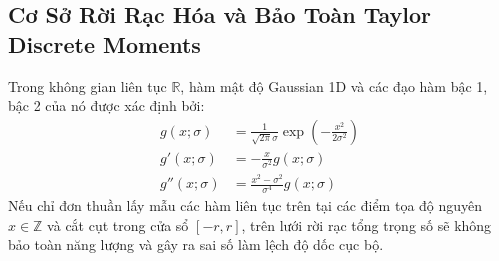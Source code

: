 \documentclass[conference]{IEEEtran}
\begin{document}
\subsection{Cơ Sở Rời Rạc Hóa và Bảo Toàn Taylor Discrete Moments}
Trong không gian liên tục $\mathbb{R}$, hàm mật độ Gaussian 1D và các đạo hàm bậc 1, bậc 2 của nó được xác định bởi:
\begin{align}
g(x; \sigma) &= \frac{1}{\sqrt{2\pi}\sigma} \exp\left(-\frac{x^2}{2\sigma^2}\right) \label{eq:gauss0} \\
g'(x; \sigma) &= -\frac{x}{\sigma^2} g(x; \sigma) \label{eq:gauss1} \\
g''(x; \sigma) &= \frac{x^2 - \sigma^2}{\sigma^4} g(x; \sigma) \label{eq:gauss2}
\end{align}
Nếu chỉ đơn thuần lấy mẫu các hàm liên tục trên tại các điểm tọa độ nguyên $x \in \mathbb{Z}$ và cắt cụt trong cửa sổ $[-r, r]$, trên lưới rời rạc tổng trọng số sẽ không bảo toàn năng lượng và gây ra sai số làm lệch độ dốc cục bộ.
\end{document}
